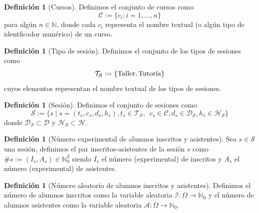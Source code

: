 \documentclass[11pt,a4paper]{book}
\theoremstyle{definition}%
\newtheorem{definicion}[teorema]{Definici\'on}
\newcommand{\Natural}{\mathbb{N}}
\begin{document}
            \begin{definicion}[Cursos]
                Definimos el conjunto de cursos como
                \begin{equation*}
                    \mathcal{C}:=\{c_i: i=1,\ldots,n\}
                \end{equation*}
                para algún $n\in\mathbb{N}$, donde cada $c_i$ representa el nombre textual (o algún tipo de identficador numérico) de un curso.
            \end{definicion}

            \begin{definicion}[Tipo de sesión]
                Definimos el conjunto de los tipos de sesiones como
                \begin{equation*}
                    \mathcal{T}_\mathcal{S}:=\{\textup{Taller},\textup{Tutoría}\}
                \end{equation*}
                cuyos elementos representan el nombre textual de los tipos de sesiones.
            \end{definicion}

            \begin{definicion}[Sesión]
                Definimos el conjunto de sesiones como
                \begin{equation*}
                    \mathcal{S}:=\{s\mid s=(t_s,c_s,d_s,h_s),t_s\in\mathcal{T}_\mathcal{S},\enspace c_s\in \mathcal{C},d_s\in\mathcal{D}_\mathcal{S},h_s\in\mathcal{H}_\mathcal{S}\}
                \end{equation*}
                donde $\mathcal{D}_\mathcal{S}\subset\mathcal{D}$ y $\mathcal{H}_\mathcal{S}\subset\mathcal{H}$.
            \end{definicion}

            \begin{definicion}[Número experimental de alumnos inscritos y asistentes]
                Sea $s\in\mathcal{S}$ una sesión, definimos el par inscritos-asistentes de la sesión $s$ como $\#s:=(I_s,A_s)\in\Natural_0^2$ siendo $I_s$ el número (experimental) de inscritos y $A_s$ el número (experimental) de asistentes.
            \end{definicion}

            \begin{definicion}[Número aleatorio de alumnos inscritos y asistentes]
                Definimos el número de alumnos inscritos como la variable aleatoria $\mathcal{I}:\Omega\longrightarrow \Natural_0$ y el número de alumnos asistentes como la variable aleatoria $\mathcal{A}:\Omega\longrightarrow \Natural_0$.
            \end{definicion}
\end{document}
